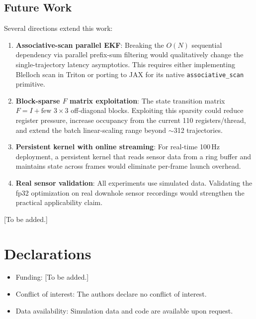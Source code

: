\documentclass[pdflatex,sn-mathphys-num]{sn-jnl}%
\theoremstyle{thmstyleone}%
\theoremstyle{thmstyletwo}%
\theoremstyle{thmstylethree}%
\begin{document}
\subsection{Future Work}\label{subsec:future}

Several directions extend this work:

\begin{enumerate}
\item \textbf{Associative-scan parallel EKF}: Breaking the $O(N)$ sequential dependency via parallel prefix-sum filtering would qualitatively change the single-trajectory latency asymptotics. This requires either implementing Blelloch scan in Triton or porting to JAX for its native \texttt{associative\_scan} primitive.

\item \textbf{Block-sparse $F$ matrix exploitation}: The state transition matrix $F = I + \text{few } 3\times3$ off-diagonal blocks. Exploiting this sparsity could reduce register pressure, increase occupancy from the current 110 registers/thread, and extend the batch linear-scaling range beyond $\sim$312 trajectories.

\item \textbf{Persistent kernel with online streaming}: For real-time 100\,Hz deployment, a persistent kernel that reads sensor data from a ring buffer and maintains state across frames would eliminate per-frame launch overhead.

\item \textbf{Real sensor validation}: All experiments use simulated data. Validating the fp32 optimization on real downhole sensor recordings would strengthen the practical applicability claim.
\end{enumerate}


\backmatter


[To be added.]

\section*{Declarations}

\begin{itemize}
\item Funding: [To be added.]
\item Conflict of interest: The authors declare no conflict of interest.
\item Data availability: Simulation data and code are available upon request.
\end{itemize}


\end{document}
